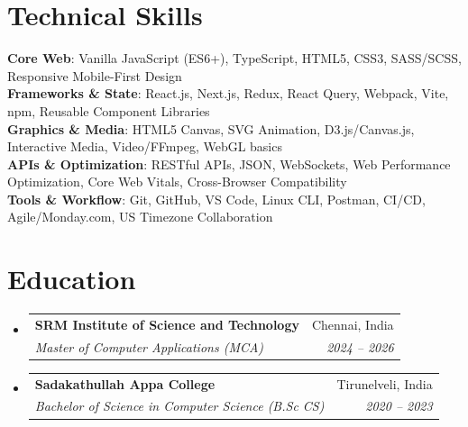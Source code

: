 \documentclass[letterpaper,10pt]{article}
\makeatletter
\newcommand{\resumeSubheading}[4]{
  \vspace{-2pt}\item
    \begin{tabular*}{0.97\textwidth}[t]{l@{\extracolsep{\fill}}r}
      \textbf{#1} & #2 \\
      \textit{\small#3} & \textit{\small #4} \\
    \end{tabular*}\vspace{-6pt}
}
\newcommand{\resumeSubHeadingListStart}{\begin{itemize}[leftmargin=0.15in, label={}]}
\newcommand{\resumeSubHeadingListEnd}{\end{itemize}}
\makeatother
\begin{document}
\section{Technical Skills}
 \begin{itemize}[leftmargin=0.15in, label={}]
    \small{\item{
     \textbf{Core Web}{: Vanilla JavaScript (ES6+), TypeScript, HTML5, CSS3, SASS/SCSS, Responsive Mobile-First Design} \\
     \textbf{Frameworks \& State}{: React.js, Next.js, Redux, React Query, Webpack, Vite, npm, Reusable Component Libraries} \\
     \textbf{Graphics \& Media}{: HTML5 Canvas, SVG Animation, D3.js/Canvas.js, Interactive Media, Video/FFmpeg, WebGL basics} \\
     \textbf{APIs \& Optimization}{: RESTful APIs, JSON, WebSockets, Web Performance Optimization, Core Web Vitals, Cross-Browser Compatibility} \\
     \textbf{Tools \& Workflow}{: Git, GitHub, VS Code, Linux CLI, Postman, CI/CD, Agile/Monday.com, US Timezone Collaboration}
    }}
 \end{itemize}

\section{Education}
  \resumeSubHeadingListStart
    \resumeSubheading
      {SRM Institute of Science and Technology}{Chennai, India}
      {Master of Computer Applications (MCA)}{2024 -- 2026}
    \resumeSubheading
      {Sadakathullah Appa College}{Tirunelveli, India}
      {Bachelor of Science in Computer Science (B.Sc CS)}{2020 -- 2023}
  \resumeSubHeadingListEnd

\end{document}

